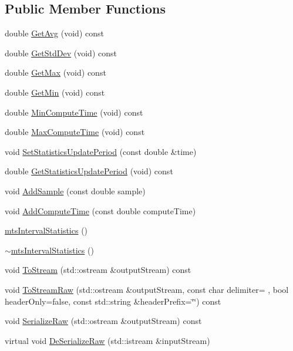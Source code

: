\subsection*{Public Member Functions}
\begin{DoxyCompactItemize}
\item 
double \hyperlink{classmts_interval_statistics_a78d4ee8d06b649edda768bd78f64e227}{Get\+Avg} (void) const 
\item 
double \hyperlink{classmts_interval_statistics_ad544bdd39b772d638923ee7e5d1d76e2}{Get\+Std\+Dev} (void) const 
\item 
double \hyperlink{classmts_interval_statistics_a37dfcf3ca62d8a1f05b6b0b554a9e084}{Get\+Max} (void) const 
\item 
double \hyperlink{classmts_interval_statistics_aede03b7f8f081cf40f4db3f7ff63d635}{Get\+Min} (void) const 
\item 
double \hyperlink{classmts_interval_statistics_a8c168d10dc2fad2156f5fea9f413a51d}{Min\+Compute\+Time} (void) const 
\item 
double \hyperlink{classmts_interval_statistics_a3b93fdd05e74ef0933effa0754563a2a}{Max\+Compute\+Time} (void) const 
\item 
void \hyperlink{classmts_interval_statistics_a659cb1005642f9e4332dfc528b948aff}{Set\+Statistics\+Update\+Period} (const double \&time)
\item 
double \hyperlink{classmts_interval_statistics_a402120b2624be728d11231cf93f7e99f}{Get\+Statistics\+Update\+Period} (void) const 
\item 
void \hyperlink{classmts_interval_statistics_a14f876fd34e6dfbf6625a495f9c9bb0e}{Add\+Sample} (const double sample)
\item 
void \hyperlink{classmts_interval_statistics_ab602553c4e0c91c2d3cc1e0210828917}{Add\+Compute\+Time} (const double compute\+Time)
\item 
\hyperlink{classmts_interval_statistics_a3d0c34a5a126ebfbb5d8e665613a7d32}{mts\+Interval\+Statistics} ()
\item 
\hyperlink{classmts_interval_statistics_ae8d2cde55f985fb99392a7c9fed95265}{$\sim$mts\+Interval\+Statistics} ()
\item 
void \hyperlink{classmts_interval_statistics_a19fcd98cd32d96a6d46953dd7bf9c571}{To\+Stream} (std\+::ostream \&output\+Stream) const 
\item 
void \hyperlink{classmts_interval_statistics_a4a6546735b638f8c88a5031302520788}{To\+Stream\+Raw} (std\+::ostream \&output\+Stream, const char delimiter= \textquotesingle{} \textquotesingle{}, bool header\+Only=false, const std\+::string \&header\+Prefix=\char`\"{}\char`\"{}) const 
\item 
void \hyperlink{classmts_interval_statistics_ab63b417d42eace74ef8f688f768e2c17}{Serialize\+Raw} (std\+::ostream \&output\+Stream) const 
\item 
virtual void \hyperlink{classmts_interval_statistics_a4b5f087223826a7ddc6f6b8c1c7763a1}{De\+Serialize\+Raw} (std\+::istream \&input\+Stream)
\end{DoxyCompactItemize}


